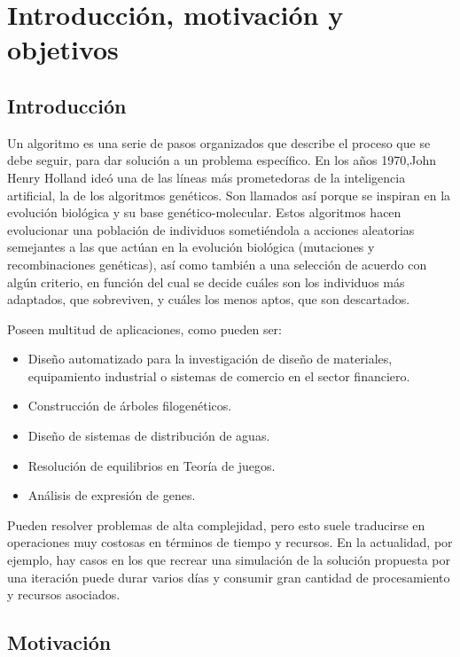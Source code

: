 \chapter{Introducción, motivación y objetivos}


\section{Introducción}
\bigskip

Un algoritmo es una serie de pasos organizados que describe el proceso que se debe seguir, para dar solución a un problema específico. En los años 1970,John Henry Holland ideó una de las líneas más prometedoras de la inteligencia artificial, la de los algoritmos genéticos. Son llamados así porque se inspiran en la evolución biológica y su base genético-molecular. Estos algoritmos hacen evolucionar una población de individuos sometiéndola a acciones aleatorias semejantes a las que actúan en la evolución biológica (mutaciones y recombinaciones genéticas), así como también a una selección de acuerdo con algún criterio, en función del cual se decide cuáles son los individuos más adaptados, que sobreviven, y cuáles los menos aptos, que son descartados.

\bigskip
Poseen multitud de aplicaciones, como pueden ser:

\begin{itemize}
	\item Diseño automatizado para la investigación de diseño de materiales, equipamiento industrial o sistemas de comercio en el sector financiero.
	\item Construcción de árboles filogenéticos.
	\item Diseño de sistemas de distribución de aguas.
	\item Resolución de equilibrios en Teoría de juegos.
	\item Análisis de expresión de genes.
\end{itemize}

\bigskip
Pueden resolver problemas de alta complejidad, pero esto suele traducirse en operaciones muy costosas en términos de tiempo y recursos. En la actualidad, por ejemplo, hay casos en los que recrear una simulación de la solución propuesta por una iteración puede durar varios días y consumir gran cantidad de procesamiento y recursos asociados.


\bigskip
\section{Motivación}
\bigskip


